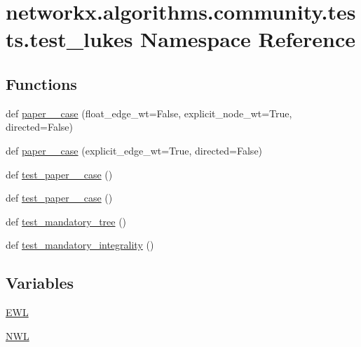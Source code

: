 \hypertarget{namespacenetworkx_1_1algorithms_1_1community_1_1tests_1_1test__lukes}{}\section{networkx.\+algorithms.\+community.\+tests.\+test\+\_\+lukes Namespace Reference}
\label{namespacenetworkx_1_1algorithms_1_1community_1_1tests_1_1test__lukes}
\subsection*{Functions}
\begin{DoxyCompactItemize}
\item 
def \hyperlink{namespacenetworkx_1_1algorithms_1_1community_1_1tests_1_1test__lukes_ab58ce584c72d8db6e7fdadd8879241f1}{paper\+\_\+\_\+case} (float\+\_\+edge\+\_\+wt=False, explicit\+\_\+node\+\_\+wt=True, directed=False)
\item 
def \hyperlink{namespacenetworkx_1_1algorithms_1_1community_1_1tests_1_1test__lukes_a2cfb8456e99b9eee255c280923d23028}{paper\+\_\+\_\+case} (explicit\+\_\+edge\+\_\+wt=True, directed=False)
\item 
def \hyperlink{namespacenetworkx_1_1algorithms_1_1community_1_1tests_1_1test__lukes_aaf80eb4287896365642f549984582180}{test\+\_\+paper\+\_\+\_\+case} ()
\item 
def \hyperlink{namespacenetworkx_1_1algorithms_1_1community_1_1tests_1_1test__lukes_aafc6ec475ea9f334bd76526f77a28e91}{test\+\_\+paper\+\_\+\_\+case} ()
\item 
def \hyperlink{namespacenetworkx_1_1algorithms_1_1community_1_1tests_1_1test__lukes_ae728fa4871a9fd8615c3048736e9ae32}{test\+\_\+mandatory\+\_\+tree} ()
\item 
def \hyperlink{namespacenetworkx_1_1algorithms_1_1community_1_1tests_1_1test__lukes_a63ef303c44eab85b9ec2a024dc61ed01}{test\+\_\+mandatory\+\_\+integrality} ()
\end{DoxyCompactItemize}
\subsection*{Variables}
\begin{DoxyCompactItemize}
\item 
\hyperlink{namespacenetworkx_1_1algorithms_1_1community_1_1tests_1_1test__lukes_abbeaaa755b313cee4d07359ab3877e5c}{E\+WL}
\item 
\hyperlink{namespacenetworkx_1_1algorithms_1_1community_1_1tests_1_1test__lukes_a044657399eccf872946447e38afc90d8}{N\+WL}
\end{DoxyCompactItemize}


